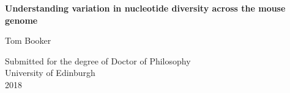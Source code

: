 \thispagestyle{empty}

\begin{minipage}{\textwidth}
\end{minipage}
\begin{center}
\vspace{2cm}
{ \Huge \textbf{Understanding variation in nucleotide diversity across the mouse genome}
  \par
  \vspace{2.5cm} 


{\Large Tom Booker \par}
}
\end{center}
\vfill
\begin{center}
\vspace{0.5cm}
{\Large Submitted for the degree of Doctor of Philosophy\\
University of Edinburgh\\
2018}
\end{center}

\newpage
\thispagestyle{empty}


